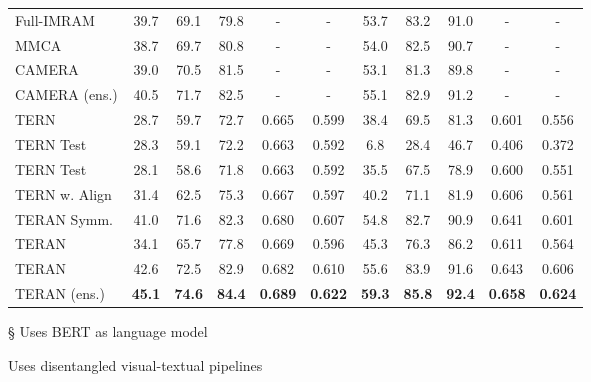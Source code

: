\documentclass[acmsmall]{acmart}
\newcommand{\majorrevised}[1]{#1}
\begin{document}
\begin{table}[t]
\begin{threeparttable}
\begin{tabular}{LCCCCCCCCCC}
Full-IMRAM \cite{Chen2020imram} &  39.7 & 69.1 & 79.8 & - & - & 53.7 & 83.2 & 91.0 & - & - \\
\majorrevised{MMCA \cite{wei2020multi} \tnote{\S}} & \majorrevised{38.7} & \majorrevised{69.7} & \majorrevised{80.8} & - & - & \majorrevised{54.0} & \majorrevised{82.5} & \majorrevised{90.7} & - & - \\
\majorrevised{CAMERA \cite{qu2020context} \tnote{\S} \tnote{\textdagger}} & \majorrevised{39.0} & \majorrevised{70.5} & \majorrevised{81.5} & - & - & \majorrevised{53.1} & \majorrevised{81.3} & \majorrevised{89.8} & - & - \\
\majorrevised{CAMERA (ens.) \cite{qu2020context} \tnote{\S} \tnote{\textdagger}} & \majorrevised{40.5} & \majorrevised{71.7} & \majorrevised{82.5} & - & - & \majorrevised{55.1} & \majorrevised{82.9} & \majorrevised{91.2} & - & - \\

\midrule
TERN \cite{messina2020tern} & 28.7 & 59.7 & 72.7 & 0.665 & 0.599 & 38.4 & 69.5 & 81.3 & 0.601 & 0.556\\
TERN Test & 28.3 & 59.1 & 72.2 & 0.663 & 0.592 & 6.8 & 28.4 & 46.7 & 0.406 & 0.372 \\
TERN Test & 28.1 & 58.6 & 71.8 & 0.663 & 0.592 & 35.5 & 67.5 & 78.9 & 0.600 & 0.551 \\
TERN w. Align & 31.4 & 62.5 & 75.3 & 0.667 & 0.597 & 40.2 & 71.1 & 81.9 & 0.606 & 0.561 \\
\midrule
TERAN Symm. & 41.0 & 71.6 & 82.3 & 0.680 & 0.607 & 54.8 & 82.7 & 90.9 & 0.641 & 0.601\\
TERAN  & 34.1 & 65.7 & 77.8 & 0.669 & 0.596 & 45.3 & 76.3 & 86.2 & 0.611 & 0.564\\
TERAN  & 42.6 & 72.5 & 82.9 & 0.682 & 0.610 & 55.6 & 83.9 & 91.6 & 0.643 & 0.606 \\
\majorrevised{TERAN (ens.)} & \majorrevised{\textbf{45.1}} & \majorrevised{\textbf{74.6}} & \majorrevised{\textbf{84.4}} & \majorrevised{\textbf{0.689}} & \majorrevised{\textbf{0.622}} & \majorrevised{\textbf{59.3}} & \majorrevised{\textbf{85.8}} & \majorrevised{\textbf{92.4}} & \majorrevised{\textbf{0.658}} & \majorrevised{\textbf{0.624}} \\
\bottomrule
\end{tabular}
\label{tab:results_mscoco_5k}
\begin{tablenotes}
    \item[\S] Uses BERT as language model
    \item[\textdagger] Uses disentangled visual-textual pipelines
\end{tablenotes}
\end{threeparttable}
\end{table}
\end{document}
